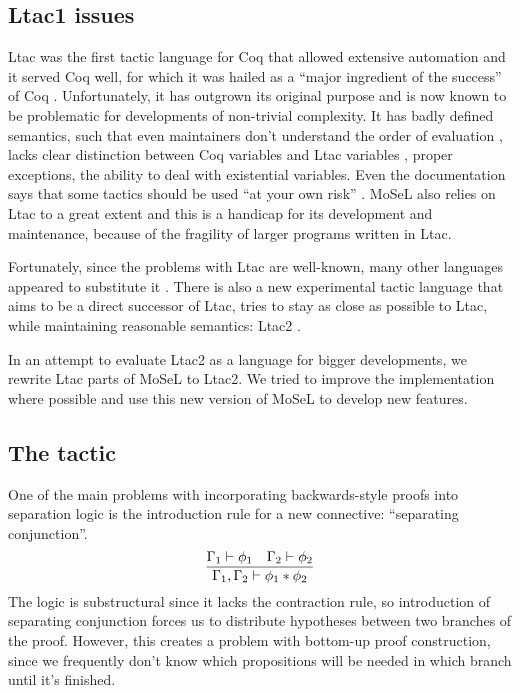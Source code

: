 \subsection{Ltac1 issues}
\label{sec:ltac1-issues}
Ltac was the first tactic language for Coq that allowed extensive automation and it served Coq well, for which it was hailed as a ``major ingredient of the success'' of Coq \cite{pedrotLtac2TacticalWarfare2019}.
Unfortunately, it has outgrown its original purpose and is now known to be problematic for developments of non-trivial complexity.
It has badly defined semantics, such that even maintainers don't understand the order of evaluation \cite{pedrotLtacInternals2016}, lacks clear distinction between Coq variables and Ltac variables \cite{pedrotLtacInternals2016}, proper exceptions, the ability to deal with existential variables.
Even the documentation says that some tactics should be used ``at your own risk'' \cite[Section~3.3.1]{thecoqdevelopmentteamCoqProofAssistant2020}.
MoSeL also relies on Ltac to a great extent and this is a handicap for its development and maintenance, because of the fragility of larger programs written in Ltac.

Fortunately, since the problems with Ltac are well-known, many other languages appeared to substitute it \cite{malechaExtensibleEfficientAutomation2016, zilianiMtacMonadTyped2013, kaiserMtac2TypedTactics2018a, tassiElpiExtensionLanguage2018}.
There is also a new experimental tactic language that aims to be a direct successor of Ltac, tries to stay as close as possible to Ltac, while maintaining reasonable semantics: Ltac2 \cite{pedrotLtac2TacticalWarfare2019}.

In an attempt to evaluate Ltac2 as a language for bigger developments, we rewrite Ltac parts of MoSeL to Ltac2.
We tried to improve the implementation where possible and use this new version of MoSeL to develop new features.

\subsection{The  tactic}
\label{sec:isplit-tactic}

One of the main problems with incorporating backwards-style proofs into separation logic is the introduction rule for a new connective: ``separating conjunction''.
\[\infer{\Gamma_1, \Gamma_2 \vdash \phi_1 \ast \phi_2}
        {\Gamma_1 \vdash \phi_1 &
         \Gamma_2 \vdash \phi_2} \]
The logic is substructural since it lacks the contraction rule, so introduction of separating conjunction forces us to distribute hypotheses between two branches of the proof.
However, this creates a problem with bottom-up proof construction, since we frequently don't know which propositions will be needed in which branch until it's finished.

